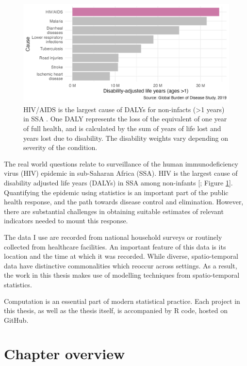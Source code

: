 \documentclass[a4paper, nobind]{templates/ociamthesis}
\begin{document}
\begin{figure}

{\centering \includegraphics[width=0.95\linewidth]{figures/introduction/gbd} 

}

\caption{HIV/AIDS is the largest cause of DALYs for non-infacts (\textgreater1 years) in SSA \autocite{ihme2019}. One DALY represents the loss of the equivalent of one year of full health, and is calculated by the sum of years of life lost and years lost due to disability. The disability weights vary depending on severity of the condition.}\label{fig:gbd}
\end{figure}

The real world questions relate to surveillance of the human immunodeficiency virus (HIV) epidemic in sub-Saharan Africa (SSA).
HIV is the largest cause of disability adjusted life years (DALYs) in SSA among non-infants {[}\textcite{ihme2019}; Figure \ref{fig:gbd}{]}.
Quantifying the epidemic using statistics is an important part of the public health response, and the path towards disease control and elimination.
However, there are substantial challenges in obtaining suitable estimates of relevant indicators needed to mount this response.

The data I use are recorded from national household surveys or routinely collected from healthcare facilities.
An important feature of this data is its location and the time at which it was recorded.
While diverse, spatio-temporal data have distinctive commonalities which reoccur across settings.
As a result, the work in this thesis makes use of modelling techniques from spatio-temporal statistics.

Computation is an essential part of modern statistical practice.
Each project in this thesis, as well as the thesis itself, is accompanied by R code, hosted on GitHub.

\hypertarget{chapter-overview}{%
\section{Chapter overview}\label{chapter-overview}}
\end{document}
